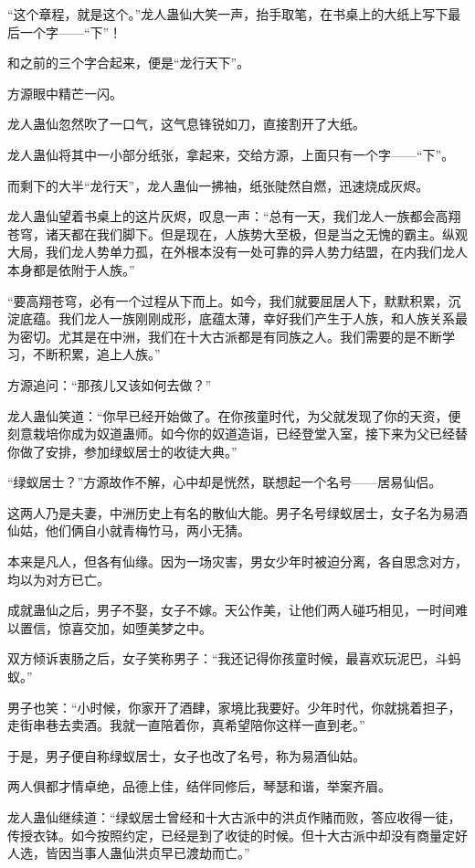 \begin{this_body}
“这个章程，就是这个。”龙人蛊仙大笑一声，抬手取笔，在书桌上的大纸上写下最后一个字——“下”！

和之前的三个字合起来，便是“龙行天下”。

方源眼中精芒一闪。

龙人蛊仙忽然吹了一口气，这气息锋锐如刀，直接割开了大纸。

龙人蛊仙将其中一小部分纸张，拿起来，交给方源，上面只有一个字——“下”。

而剩下的大半“龙行天”，龙人蛊仙一拂袖，纸张陡然自燃，迅速烧成灰烬。

龙人蛊仙望着书桌上的这片灰烬，叹息一声：“总有一天，我们龙人一族都会高翔苍穹，诸天都在我们脚下。但是现在，人族势大至极，但是当之无愧的霸主。纵观大局，我们龙人势单力孤，在外根本没有一处可靠的异人势力结盟，在内我们龙人本身都是依附于人族。”

“要高翔苍穹，必有一个过程从下而上。如今，我们就要屈居人下，默默积累，沉淀底蕴。我们龙人一族刚刚成形，底蕴太薄，幸好我们产生于人族，和人族关系最为密切。尤其是在中洲，我们在十大古派都是有同族之人。我们需要的是不断学习，不断积累，追上人族。”

方源追问：“那孩儿又该如何去做？”

龙人蛊仙笑道：“你早已经开始做了。在你孩童时代，为父就发现了你的天资，便刻意栽培你成为奴道蛊师。如今你的奴道造诣，已经登堂入室，接下来为父已经替你做了安排，参加绿蚁居士的收徒大典。”

“绿蚁居士？”方源故作不解，心中却是恍然，联想起一个名号——居易仙侣。

这两人乃是夫妻，中洲历史上有名的散仙大能。男子名号绿蚁居士，女子名为易酒仙姑，他们俩自小就青梅竹马，两小无猜。

本来是凡人，但各有仙缘。因为一场灾害，男女少年时被迫分离，各自思念对方，均以为对方已亡。

成就蛊仙之后，男子不娶，女子不嫁。天公作美，让他们两人碰巧相见，一时间难以置信，惊喜交加，如堕美梦之中。

双方倾诉衷肠之后，女子笑称男子：“我还记得你孩童时候，最喜欢玩泥巴，斗蚂蚁。”

男子也笑：“小时候，你家开了酒肆，家境比我要好。少年时代，你就挑着担子，走街串巷去卖酒。我就一直陪着你，真希望陪你这样一直到老。”

于是，男子便自称绿蚁居士，女子也改了名号，称为易酒仙姑。

两人俱都才情卓绝，品德上佳，结伴同修后，琴瑟和谐，举案齐眉。

龙人蛊仙继续道：“绿蚁居士曾经和十大古派中的洪贞作赌而败，答应收得一徒，传授衣钵。如今按照约定，已经是到了收徒的时候。但十大古派中却没有商量定好人选，皆因当事人蛊仙洪贞早已渡劫而亡。”


\end{this_body}
